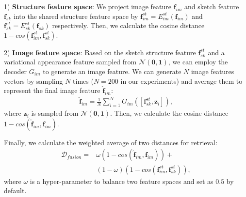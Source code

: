\documentclass[10pt,twocolumn,letterpaper]{article}
\begin{document}
1) \textbf{Structure feature space}: We project image feature $\mathbf{f}_{im}$ and sketch feature $\mathbf{f}_{sk}$ into the shared structure feature space by $\mathbf{f}_{im}^{st}=E_{im}^{st}(\mathbf{f}_{im})$ and $\mathbf{f}_{sk}^{st}=E_{sk}^{st}(\mathbf{f}_{sk})$ respectively. Then, we calculate the cosine distance $1\!-\!cos(\mathbf{f}^{st}_{im}, \mathbf{f}^{st}_{sk})$.

2) \textbf{Image feature space}: Based on the sketch structure feature $\mathbf{f}_{sk}^{st}$ and a variational appearance feature sampled from $\mathcal{N}(\mathbf{0},\mathbf{1})$, we can employ the decoder $G_{im}$ to generate an image feature. We can generate $N$ image features vectors by sampling $N$ times ($N=200$ in our experiments) and average them to represent the final image feature $\hat{\mathbf{f}}_{im}$:
    \vspace{-5pt}
    \begin{align}
        \hat{\mathbf{f}}_{im} = \frac{1}{N}\sum_{i=1}^{N}G_{im}([\mathbf{f}_{sk}^{st}, \mathbf{z}_i]),
    \end{align}
    where $\mathbf{z}_i$ is sampled from $\mathcal{N}(\mathbf{0},\mathbf{1})$. Then, we calculate the cosine distance $1\!-\!cos(\hat{\mathbf{f}}_{im}, \mathbf{f}_{im})$.

Finally, we calculate the weighted average of two distances for retrieval:
\vspace{-5pt}
\begin{equation}
\begin{aligned}
    \mathcal{D}_{fusion} =& \omega (1\!-\!cos(\hat{\mathbf{f}}_{im}, \mathbf{f}_{im})) +  \\
    & (1\!-\!\omega) (1\!-\!cos(\mathbf{f}^{st}_{im}, \mathbf{f}^{st}_{sk})), 
\end{aligned}
\end{equation}
where $\omega$ is a hyper-parameter to balance two feature spaces and set as $0.5$ by default.
\end{document}
